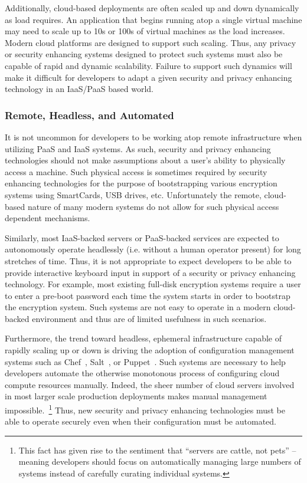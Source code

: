 Additionally, cloud-based deployments are often scaled up and down
dynamically as load requires. An application that begins running atop
a single virtual machine may need to scale up to 10s or 100s of
virtual machines as the load increases. Modern cloud platforms are
designed to support such scaling. Thus, any privacy or security
enhancing systems designed to protect such systems must also be
capable of rapid and dynamic scalability. Failure to support such
dynamics will make it difficult for developers to adapt a given
security and privacy enhancing technology in an IaaS/PaaS based world.

\subsubsection{Remote, Headless, and Automated}

It is not uncommon for developers to be working atop remote
infrastructure when utilizing PaaS and IaaS systems. As such, security
and privacy enhancing technologies should not make assumptions about a
user's ability to physically access a machine. Such physical access is
sometimes required by security enhancing technologies for the purpose
of bootstrapping various encryption systems using SmartCards, USB
drives, etc. Unfortunately the remote, cloud-based nature of many
modern systems do not allow for such physical access dependent
mechanisms.

Similarly, most IaaS-backed servers or PaaS-backed services are
expected to autonomously operate headlessly (i.e. without a human
operator present) for long stretches of time. Thus, it is not
appropriate to expect developers to be able to provide interactive
keyboard input in support of a security or privacy enhancing
technology. For example, most existing full-disk encryption systems
require a user to enter a pre-boot password each time the system
starts in order to bootstrap the encryption system. Such systems are
not easy to operate in a modern cloud-backed environment and thus are
of limited usefulness in such scenarios.

Furthermore, the trend toward headless, ephemeral infrastructure
capable of rapidly scaling up or down is driving the adoption of
configuration management systems such as Chef~\cite{chef},
Salt~\cite{salt}, or Puppet~\cite{puppet}. Such systems are necessary
to help developers automate the otherwise monotonous process of
configuring cloud compute resources manually. Indeed, the sheer number
of cloud servers involved in most larger scale production deployments
makes manual management impossible.~\footnote{This fact has given rise
  to the sentiment that ``servers are cattle, not pets'' -- meaning
  developers should focus on automatically managing large numbers of
  systems instead of carefully curating individual systems.}  Thus,
new security and privacy enhancing technologies must be able to
operate securely even when their configuration must be automated.

